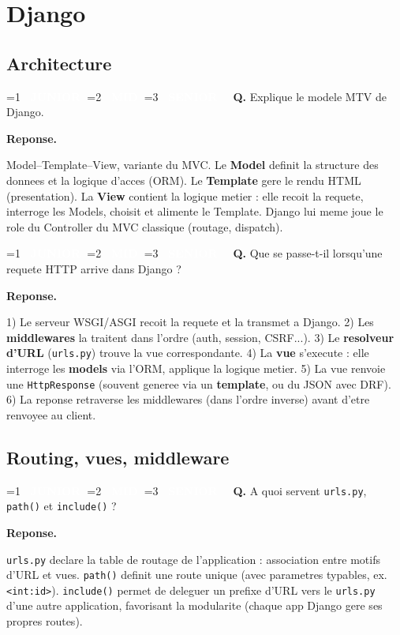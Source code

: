 \documentclass[11pt,a4paper]{article}
\newcommand{\badgeJ}{\textcolor{white}{\colorbox{junior}{\small\bfseries\ JUNIOR\ }}}
\newcommand{\badgeM}{\textcolor{white}{\colorbox{mid}{\small\bfseries\ MID\ }}}
\newcommand{\badgeS}{\textcolor{white}{\colorbox{senior}{\small\bfseries\ SENIOR\ }}}
\newcounter{qcount}
\newenvironment{qa}[2]{%
  \stepcounter{qcount}%
  \par\vspace{6pt}%
  \noindent\colorbox{qbg}{\parbox{\dimexpr\linewidth-12pt}{\vspace{2pt}%
  \ifnum#1=1 \badgeJ\fi\ifnum#1=2 \badgeM\fi\ifnum#1=3 \badgeS\fi
  \ \textbf{Q\theqcount.} #2\vspace{2pt}}}\par\vspace{4pt}%
  \noindent\textbf{\color{accent}Reponse.}\ \ignorespaces
}{%
  \par\vspace{8pt}%
}
\begin{document}
\newpage
\section{Django}

\subsection{Architecture}

\begin{qa}{1}{Explique le modele MTV de Django.}
Model--Template--View, variante du MVC. Le \textbf{Model} definit la structure
des donnees et la logique d'acces (ORM). Le \textbf{Template} gere le rendu
HTML (presentation). La \textbf{View} contient la logique metier : elle recoit
la requete, interroge les Models, choisit et alimente le Template. Django lui
meme joue le role du \og{}Controller\fg{} du MVC classique (routage, dispatch).
\end{qa}

\begin{qa}{2}{Que se passe-t-il lorsqu'une requete HTTP arrive dans Django ?}
1) Le serveur WSGI/ASGI recoit la requete et la transmet a Django.
2) Les \textbf{middlewares} la traitent dans l'ordre (auth, session, CSRF...).
3) Le \textbf{resolveur d'URL} (\texttt{urls.py}) trouve la vue correspondante.
4) La \textbf{vue} s'execute : elle interroge les \textbf{models} via l'ORM,
applique la logique metier.
5) La vue renvoie une \texttt{HttpResponse} (souvent generee via un
\textbf{template}, ou du JSON avec DRF).
6) La reponse retraverse les middlewares (dans l'ordre inverse) avant d'etre
renvoyee au client.
\end{qa}

\subsection{Routing, vues, middleware}

\begin{qa}{1}{A quoi servent \texttt{urls.py}, \texttt{path()} et \texttt{include()} ?}
\texttt{urls.py} declare la table de routage de l'application : association
entre motifs d'URL et vues. \texttt{path()} definit une route unique (avec
parametres typables, ex. \texttt{<int:id>}). \texttt{include()} permet de
deleguer un prefixe d'URL vers le \texttt{urls.py} d'une autre application,
favorisant la modularite (chaque app Django gere ses propres routes).
\end{qa}
\end{document}
